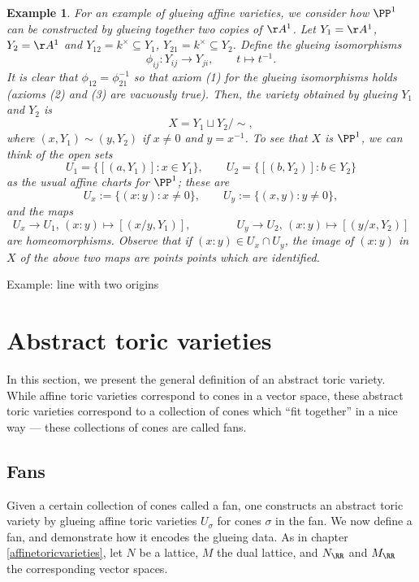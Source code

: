 \documentclass[12pt]{amsart}
\theoremstyle{plain}
\newtheorem{example}[theorem]{Example}
\begin{document}
\begin{example}
For an example of glueing affine varieties, we consider how $\PP^1$ can be constructed by glueing together two copies of $\AA^1$.
Let $Y_1=\AA^1$, $Y_2 = \AA^1$ and $Y_{12} = k^\times \subseteq Y_1$, $Y_{21} = k^\times \subseteq Y_2$.
Define the glueing isomorphisms
$$\phi_{ij} : Y_{ij} \to Y_{ji}, \qquad t \mapsto t^{-1}.$$
It is clear that $\phi_{12} = \phi_{21}^{-1}$ so that axiom (1) for the glueing isomorphisms holds (axioms (2) and (3) are vacuously true).
Then, the variety obtained by glueing $Y_1$ and $Y_2$ is
$$X = Y_1 \sqcup Y_2 / \sim,$$
where $(x, Y_1) \sim (y, Y_2)$ if $x \ne 0$ and $y = x^{-1}$.
To see that $X$ is $\PP^1$, we can  think of the open sets
$$U_1 = \{[(a, Y_1)] : x \in Y_1\}, \qquad U_2 = \{[(b, Y_2)] : b \in Y_2\}$$
as the usual affine charts for $\PP^1$;
these are
$$U_x := \{(x:y) : x \ne 0\}, \qquad U_y := \{(x, y) : y \ne 0\},$$
and the maps
$$U_x \to U_1, \, (x : y)\mapsto [(x/y, Y_1)], \qquad \qquad U_y \to U_2, \, (x : y)\mapsto [(y/x, Y_2)]$$
are homeomorphisms.
Observe that if $(x : y) \in U_x \cap U_y$, the image of $(x : y)$ in $X$ of the above two maps are points points which are identified.
\end{example}

Example: line with two origins










\newpage
{}
\section{Abstract toric varieties}
In this section, we present the general definition of an abstract toric variety.
While affine toric varieties correspond to cones in a vector space, these abstract toric varieties correspond to a collection of cones which ``fit together'' in a nice way --- these collections of cones are called fans.





\subsection{Fans}
Given a certain collection of cones called a fan, one constructs an abstract toric variety by glueing affine toric varieties $U_\sigma$ for cones $\sigma$ in the fan.
We now define a fan, and demonstrate how it encodes the glueing data.
As in chapter \ref{affinetoricvarieties}, let $N$ be a lattice, $M$ the dual lattice, and $N_\RR$ and $M_\RR$ the corresponding vector spaces.
\end{document}
